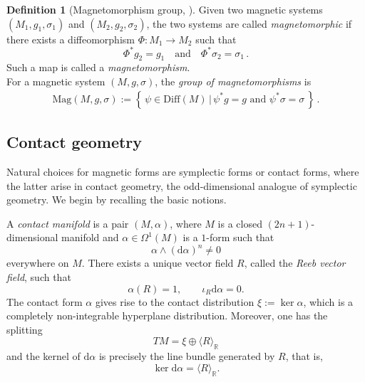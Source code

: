 \documentclass[11pt,reqno]{amsart}
\theoremstyle{plain}
\theoremstyle{definition}
\newtheorem{defn}[thm]{Definition}
\numberwithin{equation}{section}
\def\d{\delta}
\def\d{\delta}
\def\RR{{\mathbb R}}
\def\d{{\mathrm{d}}}
\newcommand{\set}[2]{\left\{ \, #1  \, | \,  #2 \, \right\}}
\begin{document}
\begin{defn}[{Magnetomorphism group, \cite[Def.~6.2]{ABM}}]
\label{defn: magnetomorphism group}
Given two magnetic systems $(M_1,g_1,\sigma_1)$ and $(M_2,g_2,\sigma_2)$, the two systems are called \emph{magnetomorphic} if there exists a diffeomorphism $\varPhi: M_1 \to M_2$ such that
\[
\varPhi^*g_2=g_1 \quad \text{and} \quad \varPhi^*\sigma_2=\sigma_1\,.
\]Such a map is called a \emph{magnetomorphism}.\\

\noindent For a magnetic system $(M,g,\sigma)$, the \textit{group of magnetomorphisms} is
\begin{align*}
    \mathrm{Mag}(M,g,\sigma)
    :=
    \set{\psi \in \mathrm{Diff}(M)}{\psi^*g = g \text{ and } \psi^* \sigma = \sigma}\, .
\end{align*}
\end{defn}

\subsection{Contact geometry}
Natural choices for magnetic forms are symplectic forms or contact forms, where the latter arise in contact geometry, the odd-dimensional analogue of symplectic geometry. We begin by recalling the basic notions.  

A \emph{contact manifold} is a pair \((M,\alpha)\), where
\(M\) is a closed \((2n+1)\)-dimensional manifold and
\(\alpha\in\Omega^1(M)\) is a \(1\)-form such that
\[
\alpha\wedge (\d\alpha)^n \neq 0
\]
everywhere on \(M\). There exists a unique vector field \(R\), called the
\emph{Reeb vector field}, such that
\[
\alpha(R)=1,
\qquad
\iota_R \d\alpha = 0.
\]
The contact form \(\alpha\) gives rise to the contact distribution $\xi:=\ker \alpha$,
which is a completely non-integrable hyperplane distribution. Moreover, one has
the splitting
\begin{equation*}\label{eq:splitting_of_TM_into_xi_R}
    TM=\xi\oplus\langle R\rangle_{\RR}
\end{equation*}
and the kernel of \(\d\alpha\) is precisely the line bundle generated
by \(R\), that is,
\begin{equation*}\label{eq: kernel_of_alpha}
    \ker \d\alpha= \langle R\rangle_{\RR}.
\end{equation*}
\end{document}
